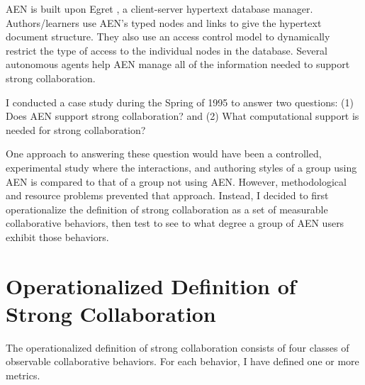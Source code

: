 AEN is built upon Egret \cite{csdl-93-09}, a client-server hypertext
database manager.  Authors/learners use AEN's typed nodes and links to give
the hypertext document structure.  They also use an access control model to
dynamically restrict the type of access to the individual nodes in the
database.  Several autonomous agents help AEN manage all of the information
needed to support strong collaboration.

I conducted a case study during the Spring of 1995 to answer two questions:
(1) Does AEN support strong collaboration? and (2) What computational
support is needed for strong collaboration?

One approach to answering these question would have been a controlled,
experimental study where the interactions, and authoring styles of a group
using AEN is compared to that of a group not using AEN.  However,
methodological and resource problems prevented that approach.  Instead, I
decided to first operationalize the definition of strong collaboration as a
set of measurable collaborative behaviors, then test to see to what degree
a group of AEN users exhibit those behaviors.  

\section{Operationalized Definition of Strong Collaboration}
\label{sec:operationalized-definition}
 
The operationalized definition of strong collaboration consists of four
classes of observable collaborative behaviors.  For each behavior, I have
defined one or more metrics.

